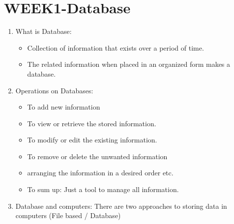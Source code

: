 \pagebreak
\section{WEEK1-Database}

\begin{enumerate}
    \item What is Database: 
    \begin{itemize}
        \item Collection of information that exists over a period of time.
        \item The related information when placed in an organized form makes a database.
    \end{itemize}
    \item Operations on Databases:
    \begin{itemize}
        \item To add new information
        \item To view or retrieve the stored information.
        \item To modify or edit the existing information.
        \item To remove or delete the unwanted information
        \item arranging the information in a desired order etc.
        \item To sum up: Just a tool to manage all information.
    \end{itemize}
    \item Database and computers: There are two approaches to storing data in computers (File based / Database)
    

\end{enumerate}
